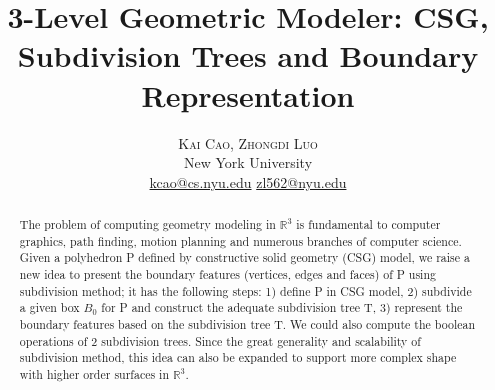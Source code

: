 \documentclass[twoside]{article}
\title{\vspace{-15mm}\fontsize{20pt}{10pt}\selectfont\textbf{3-Level Geometric Modeler: CSG, Subdivision Trees and Boundary Representation}} %
\author{
\large
\textsc{Kai Cao, Zhongdi Luo}\\[2mm] %
\normalsize New York University \\ %
\normalsize \href{mailto:kcao@cs.nyu.edu}{kcao@cs.nyu.edu} %
\normalsize \href{mailto:zl562@nyu.edu}{zl562@nyu.edu} %
\vspace{-5mm}
}
\date{}
\begin{document}
\maketitle %

\thispagestyle{fancy} %


\begin{abstract}

\noindent The problem of computing geometry modeling in $\mathbb{R}^3$ is fundamental to computer graphics, path finding, motion planning and numerous branches of computer science. Given a polyhedron P defined by constructive solid geometry (CSG) model, we raise a new idea to present the boundary features (vertices, edges and faces) of P using subdivision method; it has the following steps: 1) define P in CSG model, 2) subdivide a given box $B_0$ for P and construct the adequate subdivision tree T, 3) represent the boundary features based on the subdivision tree T. We could also compute the boolean operations of 2 subdivision trees. Since the great generality and scalability of subdivision method, this idea can also be expanded to support more complex shape with higher order surfaces in $\mathbb{R}^3$.

\end{abstract}

\end{document}
